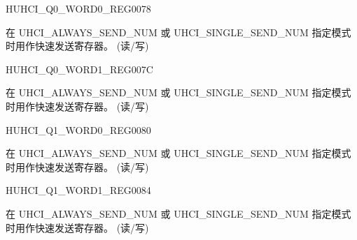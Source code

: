 \begin{register}{H}{UHCI\_Q0\_WORD0\_REG}{\hexprefix{}0078}\label{regdesc:UHCIQ0WORD0REG}
%
\regnewline%
\begin{regdesc}\begin{reglist}
\label{fielddesc:UHCISENDQ0WORD0}\item [UHCI\_SEND\_Q0\_WORD0] 在 UHCI\_ALWAYS\_SEND\_NUM 或 UHCI\_SINGLE\_SEND\_NUM 指定模式时用作快速发送寄存器。 (读/写)
\end{reglist}\end{regdesc}
\end{register}


\begin{register}{H}{UHCI\_Q0\_WORD1\_REG}{\hexprefix{}007C}\label{regdesc:UHCIQ0WORD1REG}
%
\regnewline%
\begin{regdesc}\begin{reglist}
\label{fielddesc:UHCISENDQ0WORD1}\item [UHCI\_SEND\_Q0\_WORD1] 在 UHCI\_ALWAYS\_SEND\_NUM 或 UHCI\_SINGLE\_SEND\_NUM 指定模式时用作快速发送寄存器。 (读/写)
\end{reglist}\end{regdesc}
\end{register}


\begin{register}{H}{UHCI\_Q1\_WORD0\_REG}{\hexprefix{}0080}\label{regdesc:UHCIQ1WORD0REG}
%
\regnewline%
\begin{regdesc}\begin{reglist}
\label{fielddesc:UHCISENDQ1WORD0}\item [UHCI\_SEND\_Q1\_WORD0] 在 UHCI\_ALWAYS\_SEND\_NUM 或 UHCI\_SINGLE\_SEND\_NUM 指定模式时用作快速发送寄存器。 (读/写)
\end{reglist}\end{regdesc}
\end{register}


\begin{register}{H}{UHCI\_Q1\_WORD1\_REG}{\hexprefix{}0084}\label{regdesc:UHCIQ1WORD1REG}
%
\regnewline%
\begin{regdesc}\begin{reglist}
\label{fielddesc:UHCISENDQ1WORD1}\item [UHCI\_SEND\_Q1\_WORD1] 在 UHCI\_ALWAYS\_SEND\_NUM 或 UHCI\_SINGLE\_SEND\_NUM 指定模式时用作快速发送寄存器。 (读/写)
\end{reglist}\end{regdesc}
\end{register}


